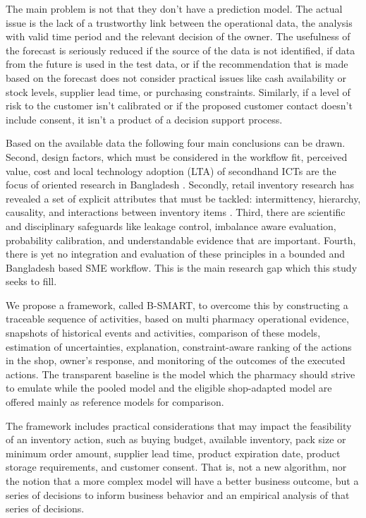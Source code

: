 \documentclass[a4paper,11pt,oneside]{book}
\theoremstyle{plain}
\theoremstyle{definition}
\theoremstyle{remark}
\newcommand{\system}{B-SMART}
\begin{document}
The main problem is not that they don't have a prediction model. The actual issue is the lack of a trustworthy link between the operational data, the analysis with valid time period and the relevant decision of the owner. The usefulness of the forecast is seriously reduced if the source of the data is not identified, if data from the future is used in the test data, or if the recommendation that is made based on the forecast does not consider practical issues like cash availability or stock levels, supplier lead time, or purchasing constraints. Similarly, if a level of risk to the customer isn't calibrated or if the proposed customer contact doesn't include consent, it isn't a product of a decision support process.

Based on the available data the following four main conclusions can be drawn. Second, design factors, which must be considered in the workflow fit, perceived value, cost and local technology adoption (LTA) of secondhand ICTs are the focus of oriented research in Bangladesh \cite{hoque2016ict,shahadat2023digital,hazra2021mfs}. Secondly, retail inventory research has revealed a set of explicit attributes that must be tackled: intermittency, hierarchy, causality, and interactions between inventory items \cite{fildes2022retail, syntetos2005intermittent, hyndman2011hierarchical, syntetos2010stock}. Third, there are scientific and disciplinary safeguards like leakage control, imbalance aware evaluation, probability calibration, and understandable evidence \cite{kaufman2012leakage,saito2015pr,niculescu2005calibration,lundberg2017shap} that are important. Fourth, there is yet no integration and evaluation of these principles in a bounded and Bangladesh based SME workflow. This is the main research gap which this study seeks to fill.

We propose a framework, called \system{}, to overcome this by constructing a traceable sequence of activities, based on multi pharmacy operational evidence, snapshots of historical events and activities, comparison of these models, estimation of uncertainties, explanation, constraint-aware ranking of the actions in the shop, owner's response, and monitoring of the outcomes of the executed actions. The transparent baseline is the model which the pharmacy should strive to emulate while the pooled model and the eligible shop-adapted model are offered mainly as reference models for comparison.

The framework includes practical considerations that may impact the feasibility of an inventory action, such as buying budget, available inventory, pack size or minimum order amount, supplier lead time, product expiration date, product storage requirements, and customer consent. That is, not a new algorithm, nor the notion that a more complex model will have a better business outcome, but a series of decisions to inform business behavior and an empirical analysis of that series of decisions.
\end{document}
